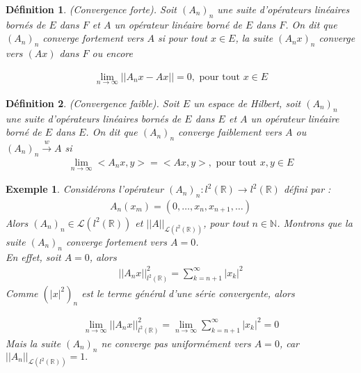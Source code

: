 \documentclass{report}
\newtheorem{Def}{Définition}[subsection]
\newtheorem{Ex}{Exemple}[subsection]
\begin{document}
{\begin{Def}
(Convergence forte). Soit $(A_{n})_{n}$ une suite d'opérateurs linéaires bornés de $E$ dans $F$ et $A$ un opérateur linéaire borné de $E$ dans $F$. On dit que $(A_{n})_n$ converge fortement vers $A$ si pour tout $x \in E$, la suite $(A_n x)_n$ converge vers $(A x)$ dans $F$ ou encore  

			\begin{align*}
				\lim_{n \to \infty} ||A_n x - A x|| = 0, \,\,\text{pour tout}\,\, x \in E 
			\end{align*}
\end{Def}




\begin{Def}
(Convergence faible). Soit $E$ un espace de Hilbert, soit $(A_n)_n$ une suite d'opérateurs linéaires bornés de $E$ dans $E$ et $A$ un opérateur linéaire borné de $E$ dans $E$. On dit que $(A_n)_n$ converge faiblement vers $A$ ou $(A_n)_n \xrightarrow{w} A$ si 
			\begin{align*}
				\lim_{n \to \infty} <A_n x, y> = <A x, y>, \,\,\text{pour tout}\,\, x, y \in E 
			\end{align*}
\end{Def} 



\begin{Ex}Considérons l'opérateur $(A_n)_n : l^{2}(\mathbb{R}) \rightarrow l^{2}(\mathbb{R})$ défini par : 
			\begin{align*}
			A_n (x_m) = (0, \ldots, x_n, x_{n+1}, \ldots) 
			\end{align*}	
Alors $(A_n)_n \in \mathscr{L}(l^{2}(\mathbb{R}))$ et $||A||_{\mathscr{L}(l^{2}(\mathbb{R}))}$, pour tout $n \in \mathbb{N}$. 
Montrons que la suite $(A_n)_n$ converge fortement vers $A = 0$. \\En effet, soit $A = 0$, alors  
			\begin{align*}
			||A_n x||^2_{l^{2}(\mathbb{R})} = \sum_{k=n+1}^{\infty} |x_k|^2 
			\end{align*}	
Comme $(|x|^2 )_n$ est le terme général d'une série convergente, alors 

			\begin{align*}\lim_{n \to \infty} ||A_n x||^2_{l^{2}(\mathbb{R})} =\lim_{n \to \infty} \sum_{k=n+1}^{\infty} |x_k|^2 = 0 	\end{align*}	
Mais la suite $(A_n)_n$ ne converge pas uniformément vers $A = 0$, car $||A_n||_{\mathscr{L}(l^{2}(\mathbb{R}))} = 1.$
\end{Ex}



}
\end{document}
